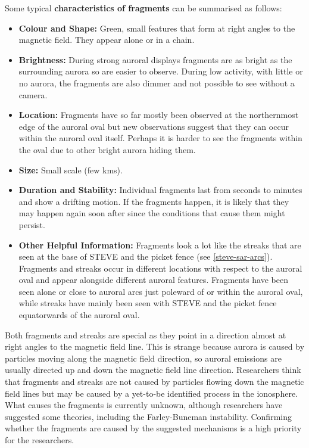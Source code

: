 \documentclass{article}
\begin{document}
Some typical {\bf characteristics of fragments} can be summarised as follows:
\begin{itemize}
    \item \textbf{Colour and Shape:} Green, small features that form at right angles to the magnetic field. They appear alone or in a chain. 
    \item \textbf{Brightness:} During strong auroral displays fragments are as bright as the surrounding aurora so are easier to observe. During low activity, with little or no aurora, the fragments are also dimmer and not possible to see without a camera.
    \item \textbf{Location:} Fragments have so far mostly been observed at the northernmost edge of the auroral oval but new observations suggest that they can occur within the auroral oval itself. Perhaps it is harder to see the fragments within the oval due to other bright aurora hiding them. 
    \item \textbf{Size:} Small scale (few kms).
    \item \textbf{Duration and Stability:} Individual fragments last from seconds to minutes and show a drifting motion. If the fragments happen, it is likely that they may happen again soon after since the conditions that cause them might persist. 
    \item \textbf{Other Helpful Information:} Fragments look a lot like the streaks that are seen at the base of STEVE and the picket fence (see \ref{steve-sar-arcs}). Fragments and streaks occur in different locations with respect to the auroral oval and appear alongside different auroral features. Fragments have been seen alone or close to auroral arcs just poleward of or within the auroral oval, while streaks have mainly been seen with STEVE and the picket fence equatorwards of the auroral oval. 
    \end{itemize}
 
Both fragments and streaks are special as they point in a direction almost at right angles to the magnetic field line. This is strange because aurora is caused by particles moving along the magnetic field direction, so auroral emissions are usually directed up and down the magnetic field line direction. Researchers think that fragments and streaks are not caused by particles flowing down the magnetic field lines but may be caused by a yet-to-be identified process in the ionosphere. What causes the fragments is currently unknown, although researchers have suggested some theories, including the Farley-Buneman instability. Confirming whether the fragments are caused by the suggested mechanisms is a high priority for the researchers. 
\end{document}
